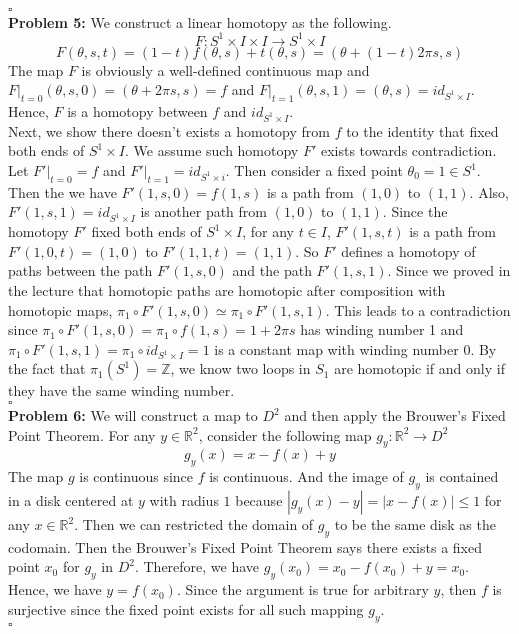 \documentclass[12pt]{amsart}
\newcommand{\R}{\mathbb{R}}
\newcommand{\Z}{\mathbb{Z}}
\begin{document}
\\\phantom{qed}\hfill$\square$\\
\textbf{Problem 5:} We construct a linear homotopy as the following.
\[F:S^1\times I\times I\rightarrow S^1\times I \]
\[F(\theta,s,t)=(1-t)f(\theta,s)+t(\theta,s)=(\theta+(1-t)2\pi s,s)\]
The map $F$ is obviously a well-defined continuous map and $F|_{t=0}(\theta,s,0)=(\theta+2\pi s,s)=f$ and $F|_{t=1}(\theta,s,1)=(\theta,s)=id_{S^1\times I}$. Hence, $F$ is a homotopy between $f$ and $id_{S^1\times I}$.\\
Next, we show there doesn't exists a homotopy from $f$ to the identity that fixed both ends of $S^1\times I$. We assume such homotopy $F'$ exists towards contradiction. Let $F'|_{t=0}=f$ and $F'|_{t=1}=id_{S^1\times i}$. Then consider a fixed point $\theta_0=1\in S^1$. Then the we have $F'(1,s,0)=f(1,s)$ is a path from $(1,0)$ to $(1,1)$. Also, $F'(1,s,1)=id_{S^1\times I}$ is another path from $(1,0)$ to $(1,1)$. Since the homotopy $F'$ fixed both ends of $S^1\times I$, for any $t\in I$, $F'(1,s,t)$ is a path from $F'(1,0,t)=(1,0)$ to $F'(1,1,t)=(1,1)$. So $F'$ defines a homotopy of paths between the path $F'(1,s,0)$ and the path $F'(1,s,1)$. Since we proved in the lecture that homotopic paths are homotopic after composition with homotopic maps, $\pi_1\circ F'(1,s,0)\simeq \pi_1\circ F'(1,s,1)$. This leads to a contradiction since $\pi_1\circ F'(1,s,0)=\pi_1\circ f(1,s)=1+2\pi s$ has winding number 1 and $\pi_1\circ F'(1,s,1)=\pi_1\circ id_{S^1\times I}=1$ is a constant map with winding number 0. By the fact that $\pi_1(S^1)=\Z$, we know two loops in $S_1$ are homotopic if and only if they have the same winding number.
\\\phantom{qed}\hfill$\square$\\
\textbf{Problem 6:} We will construct a map to $D^2$ and then apply the Brouwer's Fixed Point Theorem. For any $y\in \R^2$, consider the following map $g_y:\R^2\rightarrow D^2$
\[g_y(x)=x-f(x)+y\]
The map $g$ is continuous since $f$ is continuous. And the image of $g_y$ is contained in a disk centered at $y$ with radius $1$ because $|g_y(x)-y|=|x-f(x)|\leq 1$ for any $x\in \R^2$.
Then we can restricted the domain of $g_y$ to be the same disk as the codomain. Then the Brouwer's Fixed Point Theorem says there exists a fixed point $x_0$ for $g_y$ in $D^2$. Therefore, we have $g_y(x_0)=x_0-f(x_0)+y=x_0$. Hence, we have $y=f(x_0)$. Since the argument is true for arbitrary $y$, then $f$ is surjective since the fixed point exists for all such mapping $g_y$.
\\\phantom{qed}\hfill$\square$\\
\end{document}
